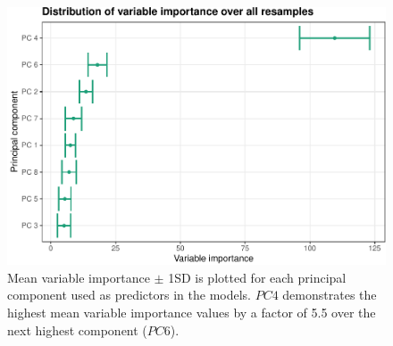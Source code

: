 \documentclass{article}
\begin{document}
\begin{figure}
\centering
\includegraphics{olet5610_report_files/figure-latex/impdists-1.pdf}
\caption{Mean variable importance \(\pm\) 1SD is plotted for each
principal component used as predictors in the models. \(PC 4\)
demonstrates the highest mean variable importance values by a factor of
5.5 over the next highest component (\(PC 6\)).}
\end{figure}
\end{document}
